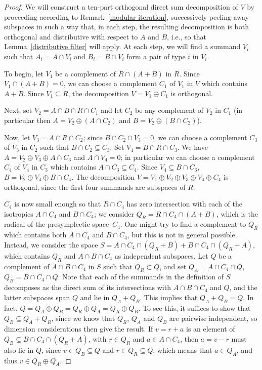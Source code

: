 \documentclass[10pt,a4paper]{amsart}
\numberwithin{equation}{section}
\begin{document}
\begin{proof}
We will construct a ten-part orthogonal direct sum decomposition of $V$ by proceeding according to Remark~\ref{modular iteration}, successively peeling away subspaces in such a way that, in each step, the resulting decomposition is both orthogonal and distributive with respect to $A$ and $B$,  i.e., so that Lemma~\ref{distributive filter} will apply. At each step, we will f\/ind a summand $V_i$ such that $A_i = A \cap V_i$ and $B_i=B \cap V_i$ form a pair of type $i$ in $V_i$.

To begin, let $V_1$ be a complement of $R \cap (A + B)$ in $R$. Since $V_1 \cap (A + B) = 0$, we can choose a complement $C_1$ of $V_1$ in $V$ which contains $A + B$.   Since $V_1\subseteq R$, the decomposition $V=V_1 \oplus C_1$ is orthogonal.

Next, set $V_2 = A \cap B \cap R \cap C_1$ and let $C_2$ be any complement of $V_2$ in $C_1$ (in particular then $A = V_2 \oplus (A \cap C_2)$ and $B = V_2 \oplus (B \cap C_2)$).

Now, let $V_3 = A \cap R \cap C_2$; since $B \cap C_2 \cap V_3 = 0$, we can choose a complement $C_3$ of $V_3$ in $C_2$ such that $B \cap C_2 \subseteq C_3$. Set $V_4 = B \cap R \cap C_3$. We have $A = V_2 \oplus V_3 \oplus A \cap C_3$ and $A \cap V_4 = 0$; in particular we can choose a complement $C_4$ of $V_4$ in $C_3$ which contains $A \cap C_3 \subseteq C_4$.   Since $V_4 \subseteq B \cap C_3$, $B = V_2 \oplus V_4 \oplus B \cap C_4$. The decomposition $V = V_1 \oplus V_2 \oplus V_3 \oplus V_4 \oplus C_4$ is orthogonal, since the f\/irst four summands are subspaces of $R$.

$C_4$ is now small enough so that $R \cap C_4$ has zero intersection with each of the isotropics $A \cap C_4$ and $B \cap C_4$; we consider $Q_R = R \cap C_4 \cap (A + B)$, which is the radical of the presymplectic space~$C_4$. One might try to f\/ind a complement to $Q_R$ which contains both $A \cap C_4$ and $B \cap C_4$, but this is not in general possible. Instead, we consider the space $S = A \cap C_4 \cap (Q_R + B) + B \cap C_4 \cap (Q_R + A)$, which contains $Q_R$ and $A \cap B \cap C_4$ as independent subspaces. Let $Q$ be a complement of $A \cap B \cap C_4$ in $S$ such that $Q_R \subset Q$, and set $Q_A = A \cap C_4 \cap Q$, $Q_B = B \cap C_4 \cap Q$. Note that each of the summands in the def\/inition of $S$ decomposes as the direct sum of its intersections with $A \cap B \cap C_4$ and $Q$, and the latter subspaces span $Q$ and lie in $Q_A +Q_B$. This implies that $Q_A + Q_B = Q$. In fact, $Q = Q_A \oplus Q_B = Q_R \oplus Q_A  = Q_R \oplus Q_B$. To see this, it suf\/f\/ices to show that $Q_B \subseteq Q_A + Q_R$, since we know that $Q_R$, $Q_A$ and $Q_B$ are pairwise independent, so dimension considerations then give the result. If $v = r + a$ is an element of $Q_B \subseteq B \cap C_4 \cap (Q_R + A)$, with $r \in Q_R$ and $a \in A \cap C_4$, then $a = v - r$ must also lie in $Q$, since $v \in Q_B \subseteq Q$ and $r \in Q_R \subseteq Q$, which means that $a \in Q_A$, and thus $v \in Q_R \oplus Q_A$.


\end{proof}
\end{document}
